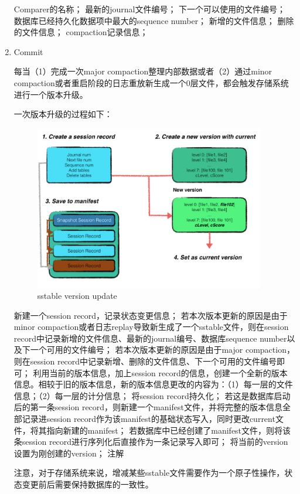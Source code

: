 \begin{enumerate}
Comparer的名称；
最新的journal文件编号；
下一个可以使用的文件编号；
数据库已经持久化数据项中最大的sequence number；
新增的文件信息；
删除的文件信息；
compaction记录信息；
		\item Commit

每当（1）完成一次major compaction整理内部数据或者（2）通过minor compaction或者重启阶段的日志重放新生成一个0层文件，都会触发存储系统进行一个版本升级。

一次版本升级的过程如下：
		
\begin{figure}[H]
	\centering
	\includegraphics[width=0.95\textwidth]{images/version_update.jpeg}
	\caption{sstable version update}
	\label{sstable_version_update}
\end{figure}


新建一个session record，记录状态变更信息；
若本次版本更新的原因是由于minor compaction或者日志replay导致新生成了一个sstable文件，则在session record中记录新增的文件信息、最新的journal编号、数据库sequence number以及下一个可用的文件编号；
若本次版本更新的原因是由于major compaction，则在session record中记录新增、删除的文件信息、下一个可用的文件编号即可；
利用当前的版本信息，加上session record的信息，创建一个全新的版本信息。相较于旧的版本信息，新的版本信息更改的内容为：（1）每一层的文件信息；（2）每一层的计分信息；
将session record持久化；
若这是数据库启动后的第一条session record，则新建一个manifest文件，并将完整的版本信息全部记录进session record作为该manifest的基础状态写入，同时更改current文件，将其指向新建的manifest；
若数据库中已经创建了manifest文件，则将该条session record进行序列化后直接作为一条记录写入即可；
将当前的version设置为刚创建的version；
注解

注意，对于存储系统来说，增减某些sstable文件需要作为一个原子性操作，状态变更前后需要保持数据库的一致性。


\end{enumerate}
